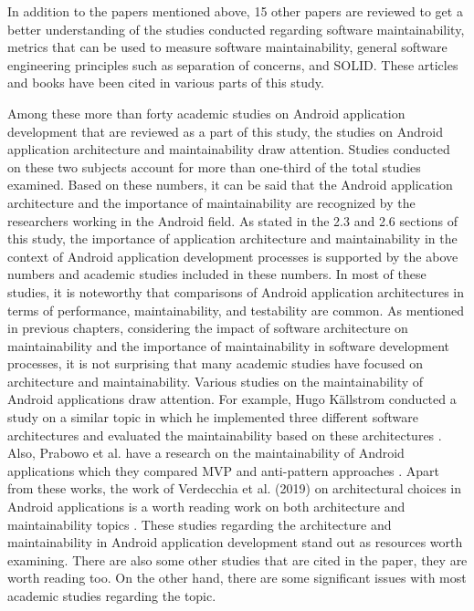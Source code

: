 In addition to the papers mentioned above, 15 other papers are reviewed to get a better understanding of the studies conducted regarding software maintainability, metrics that can be used to measure software maintainability, general software engineering principles such as separation of concerns, and SOLID. These articles and books have been cited in various parts of this study.

Among these more than forty academic studies on Android application development that are reviewed as a part of this study, the studies on Android application architecture and maintainability draw attention. Studies conducted on these two subjects account for more than one-third of the total studies examined. Based on these numbers, it can be said that the Android application architecture and the importance of maintainability are recognized by the researchers working in the Android field. As stated in the 2.3 and 2.6 sections of this study, the importance of application architecture and maintainability in the context of Android application development processes is supported by the above numbers and academic studies included in these numbers. In most of these studies, it is noteworthy that comparisons of Android application architectures in terms of performance, maintainability, and testability are common. As mentioned in previous chapters, considering the impact of software architecture on maintainability and the importance of maintainability in software development processes, it is not surprising that many academic studies have focused on architecture and maintainability. Various studies on the maintainability of Android applications draw attention. For example, Hugo Källstrom conducted a study on a similar topic in which he implemented three different software architectures and evaluated the maintainability based on these architectures \cite{18}. Also, Prabowo et al. have a research on the maintainability of Android applications which they compared MVP and anti-pattern approaches \cite{19}. Apart from these works, the work of Verdecchia et al. (2019) on architectural choices in Android applications is a worth reading work on both architecture and maintainability topics \cite{14}. These studies regarding the architecture and maintainability in Android application development stand out as resources worth examining. There are also some other studies that are cited in the paper, they are worth reading too. On the other hand, there are some significant issues with most academic studies regarding the topic. 

